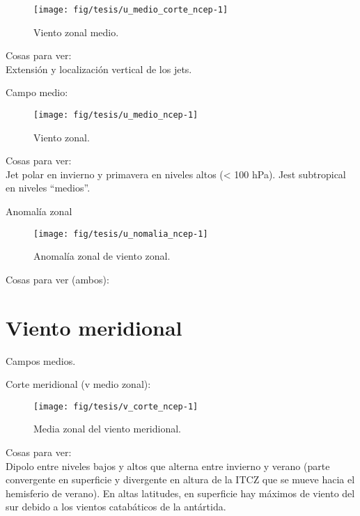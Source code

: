 \documentclass[spanish,a4paper]{book}
\begin{document}
\begin{figure}

{\centering \texttt{[image: fig/tesis/u\_medio\_corte\_ncep-1]} 

}

\caption{Viento zonal medio.}\label{fig:u_medio_corte_ncep}
\end{figure}

Cosas para ver:\\
Extensión y localización vertical de los jets.

Campo medio:

\begin{figure}

{\centering \texttt{[image: fig/tesis/u\_medio\_ncep-1]} 

}

\caption{Viento zonal.}\label{fig:u_medio_ncep}
\end{figure}

Cosas para ver:\\
Jet polar en invierno y primavera en niveles altos (\textless{} 100
hPa). Jest subtropical en niveles ``medios''.

Anomalía zonal

\begin{figure}

{\centering \texttt{[image: fig/tesis/u\_nomalia\_ncep-1]} 

}

\caption{Anomalía zonal de viento zonal.}\label{fig:u_nomalia_ncep}
\end{figure}

Cosas para ver (ambos):

\section{Viento meridional}\label{viento-meridional}

Campos medios.

Corte meridional (v medio zonal):

\begin{figure}

{\centering \texttt{[image: fig/tesis/v\_corte\_ncep-1]} 

}

\caption{Media zonal del viento meridional.}\label{fig:v_corte_ncep}
\end{figure}

Cosas para ver:\\
Dipolo entre niveles bajos y altos que alterna entre invierno y verano
(parte convergente en superficie y divergente en altura de la ITCZ que
se mueve hacia el hemisferio de verano). En altas latitudes, en
superficie hay máximos de viento del sur debido a los vientos
catabáticos de la antártida.
\end{document}
